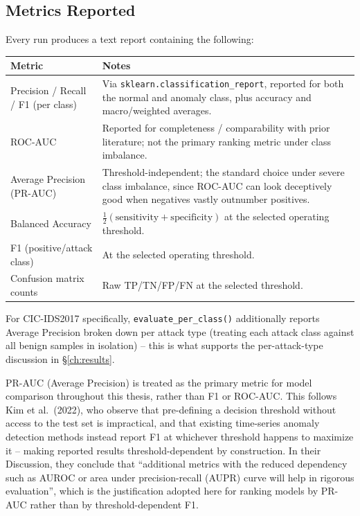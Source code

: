\subsection{Metrics Reported}

Every run produces a text report containing the following:

\begin{center}
\begin{tabular}{@{}p{4cm}p{9.5cm}@{}}
\toprule
Metric & Notes \\
\midrule
Precision / Recall / F1 (per class) & Via \texttt{sklearn.classification\_report}, reported for both the normal and anomaly class, plus accuracy and macro/weighted averages. \\
ROC-AUC & Reported for completeness / comparability with prior literature; not the primary ranking metric under class imbalance. \\
Average Precision (PR-AUC) & Threshold-independent; the standard choice under severe class imbalance, since ROC-AUC can look deceptively good when negatives vastly outnumber positives. \\
Balanced Accuracy & $\frac{1}{2}(\text{sensitivity} + \text{specificity})$ at the selected operating threshold. \\
F1 (positive/attack class) & At the selected operating threshold. \\
Confusion matrix counts & Raw TP/TN/FP/FN at the selected threshold. \\
\bottomrule
\end{tabular}
\end{center}

For CIC-IDS2017 specifically, \texttt{evaluate\_per\_class()} additionally reports Average Precision broken down per attack type (treating each attack class against all benign samples in isolation) -- this is what supports the per-attack-type discussion in \S\ref{ch:results}.

PR-AUC (Average Precision) is treated as the primary metric for model comparison throughout this thesis, rather than F1 or ROC-AUC. This follows Kim et al.\ (2022), who observe that pre-defining a decision threshold without access to the test set is impractical, and that existing time-series anomaly detection methods instead report F1 at whichever threshold happens to maximize it -- making reported results threshold-dependent by construction. In their Discussion, they conclude that \enquote{additional metrics with the reduced dependency such as AUROC or area under precision-recall (AUPR) curve will help in rigorous evaluation}, which is the justification adopted here for ranking models by PR-AUC rather than by threshold-dependent F1.


